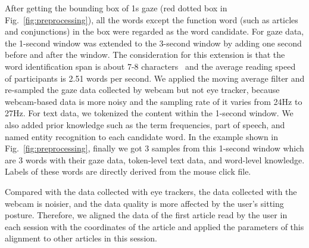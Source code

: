 After getting the bounding box of 1s gaze (red dotted box in Fig.~\ref{fig:preprocessing}), all the words except the function word (such as articles and conjunctions) in the box were regarded as the word candidate. For gaze data, the 1-second window was extended to the 3-second window by adding one second before and after the window. The consideration for this extension is that the word identification span is about 7-8 characters~\cite{RAYNER19953} and the average reading speed of participants is 2.51 words per second. We applied the moving average filter and re-sampled the gaze data collected by webcam but not eye tracker, because webcam-based data is more noisy and the sampling rate of it varies from 24Hz to 27Hz. For text data, we tokenized the content within the 1-second window. We also added prior knowledge such as the term frequencies, part of speech, and named entity recognition to each candidate word. In the example shown in Fig.~\ref{fig:preprocessing}, finally we got 3 samples from this 1-second window which are 3 words with their gaze data, token-level text data, and word-level knowledge. Labels of these words are directly derived from the mouse click file.

Compared with the data collected with eye trackers, the data collected with the webcam is noisier, and the data quality is more affected by the user's sitting posture. Therefore, we aligned the data of the first article read by the user in each session with the coordinates of the article and applied the parameters of this alignment to other articles in this session.



